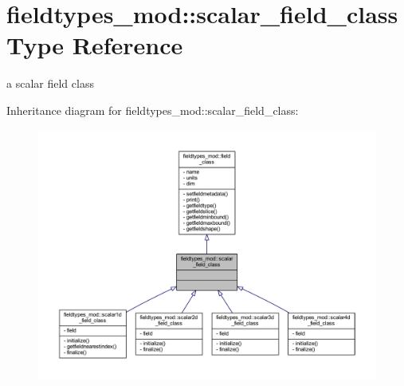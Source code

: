\hypertarget{structfieldtypes__mod_1_1scalar__field__class}{}\section{fieldtypes\+\_\+mod\+:\+:scalar\+\_\+field\+\_\+class Type Reference}
\label{structfieldtypes__mod_1_1scalar__field__class}


a scalar field class  




Inheritance diagram for fieldtypes\+\_\+mod\+:\+:scalar\+\_\+field\+\_\+class\+:\nopagebreak
\begin{figure}[H]
\begin{center}
\leavevmode
\includegraphics[width=350pt]{structfieldtypes__mod_1_1scalar__field__class__inherit__graph}
\end{center}
\end{figure}


